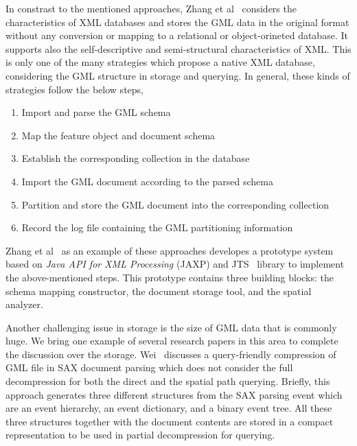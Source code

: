 \documentclass[a4paper,12pt]{article}
\begin{document}
In constrast to the mentioned approaches, Zhang et al~\cite{Zhang2008} considers the characteristics of XML databases and stores the GML data in the original format without any conversion or mapping to a relational or object-orineted database. 
It supports also the self-descriptive and semi-structural characteristics of XML.
This is only one of the many strategies which propose a native XML database, considering the GML structure in storage and querying. 
In general, these kinds of strategies follow the below steps,
\begin{enumerate}
\item Import and parse the GML schema
\item Map the feature object and document schema
\item Establish the corresponding collection in the database
\item Import the GML document according to the parsed schema
\item Partition and store the GML document into the corresponding collection
\item Record the log file containing the GML partitioning information
\end{enumerate}
Zhang et al~\cite{Zhang2008} as an example of these approaches developes a prototype system based on \textit{Java API for XML Processing} (JAXP) and JTS~\cite{jts} library to implement the above-mentioned steps. 
This prototype contains three building blocks: the schema mapping constructor, the document storage tool, 
and the spatial analyzer.

Another challenging issue in storage is the size of GML data that is commonly huge. 
We bring one example of several research papers in this area to complete the discussion over the storage.
Wei~\cite{Wei2011} discusses a query-friendly compression of GML file in SAX document 
parsing which does not consider the full decompression for both the direct and the spatial path querying. 
Briefly, this approach generates three different structures from the SAX parsing event
which are an event hierarchy, an event dictionary, and a binary event tree.
All these three structures together with the document contents are stored in a compact
representation to be used in partial decompression for querying.%
\end{document}
